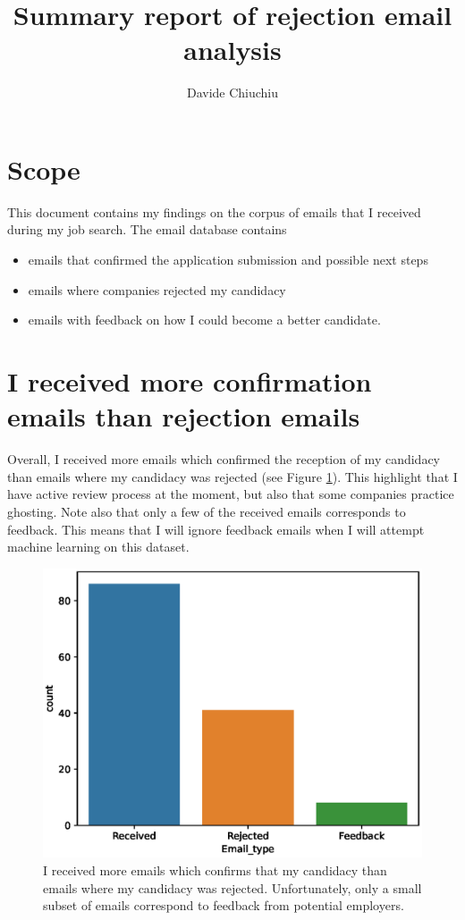 \documentclass[12pt]{article}
\begin{document}
\title{Summary report of rejection email analysis}
\author{Davide Chiuchiu}

\maketitle

\section{Scope}
This document contains my findings on the corpus of emails that I received during my job search. The email database contains 
\begin{itemize}
	\item emails that confirmed the application submission and possible next steps
	\item emails where companies rejected my candidacy
	\item emails with feedback on how I could become a better candidate.
\end{itemize}

\section{I received more confirmation emails than rejection emails}
Overall, I received more emails which confirmed the reception of my candidacy than emails where my candidacy was rejected (see Figure \ref{fig:email_type_distribution}). This highlight that I have active review process at the moment, but also that some companies practice ghosting. Note also that only a few of the received emails corresponds to feedback. This means that I will ignore feedback emails when I will attempt machine learning on this dataset.

\begin{figure}[tb!]
	\center
	\includegraphics[width = 0.5\linewidth]{email_type_distribution.eps}
	\caption{I received more emails which confirms that my candidacy than  emails where my candidacy was rejected. Unfortunately, only a small subset of emails correspond to feedback from potential employers. \label{fig:email_type_distribution}}
\end{figure}
\end{document}
